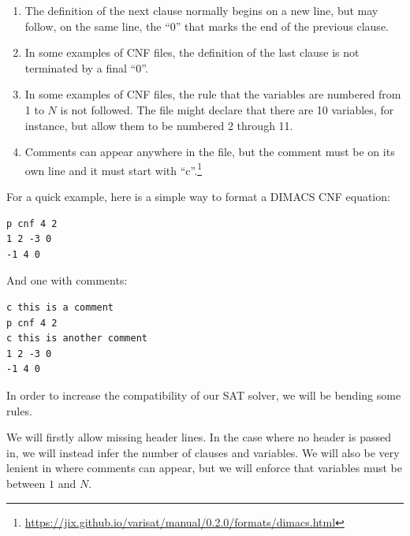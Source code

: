 \begin{enumerate}
    \item The definition of the next clause normally begins on a new line, but
    may follow, on the same line, the ``0'' that marks the end of the previous
    clause.

    \item In some examples of CNF files, the definition of the last clause is
    not terminated by a final ``0''.

    \item In some examples of CNF files, the rule that the variables are
    numbered from 1 to $N$ is not followed. The file might declare that there
    are 10 variables, for instance, but allow them to be numbered 2 through
    11.

    \item Comments can appear anywhere in the file, but the comment must be
    on its own line and it must start with ``c''.\footnote{\url{https://jix.github.io/varisat/manual/0.2.0/formats/dimacs.html}}
\end{enumerate}

For a quick example, here is a simple way to format a DIMACS CNF equation:

\begin{lstlisting}
p cnf 4 2
1 2 -3 0
-1 4 0
\end{lstlisting}

And one with comments:

\begin{lstlisting}
c this is a comment
p cnf 4 2
c this is another comment
1 2 -3 0
-1 4 0
\end{lstlisting}

In order to increase the compatibility of our SAT solver, we will be bending
some rules.

We will firstly allow missing header lines. In the case where no header is
passed in, we will instead infer the number of clauses and variables. We will
also be very lenient in where comments can appear, but we will enforce that
variables must be between $1$ and $N$.

